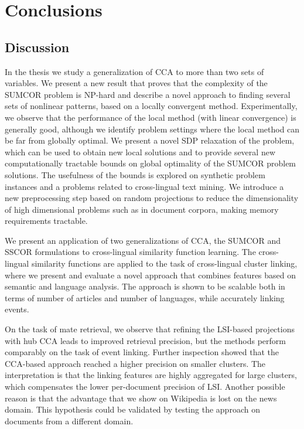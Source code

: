 %
\chapter{Conclusions}\label{chap:conclusions}

\section{Discussion}

In the thesis we study a generalization of CCA to more than two
sets of variables. We present a new result that proves that
the complexity of the SUMCOR problem 
is NP-hard and describe a novel approach to finding several sets
of nonlinear patterns, based on a locally convergent method.  
Experimentally, we observe that the
performance of the local method (with linear convergence) is
generally good, although we identify problem settings where the
local method can be far from globally optimal. We present a novel
SDP relaxation of the problem, which can be used to obtain new
local solutions and to provide several new computationally tractable bounds on
global optimality of the SUMCOR problem solutions. The
usefulness of the bounds is explored on synthetic problem
instances and a problems related to cross-lingual text
mining. We introduce a new preprocessing step based on random
projections to reduce the dimensionality of high dimensional problems
such as in document corpora, making memory requirements tractable.

We present an application of two generalizations of CCA, the
SUMCOR and SSCOR formulations to cross-lingual similarity function
learning. The cross-lingual similarity functions are applied to 
the task of cross-lingual cluster linking, where we present and evaluate a novel
approach that combines features based on semantic and language analysis.
The approach is shown to be scalable both in 
terms of number of articles and number of languages, while accurately linking events.

On the task of mate retrieval, we observe that refining the LSI-based 
projections with hub CCA leads to improved retrieval precision, but the 
methods perform comparably on the task of event linking. Further inspection 
showed that the CCA-based approach reached a higher precision on smaller 
clusters. The interpretation is that the linking features are highly 
aggregated for large clusters, which compensates the lower per-document 
precision of LSI. Another possible reason is that the advantage that we 
show on Wikipedia is lost on the news domain. This hypothesis could be 
validated by testing the approach on documents from a different domain.

